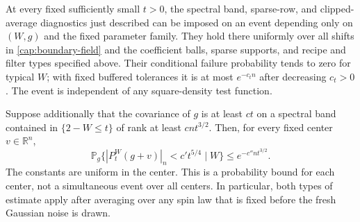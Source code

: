 \begin{lemma}\label{cap:boundary-noise}
At every fixed sufficiently small $t>0$, the spectral band, sparse-row,
and clipped-average diagnostics just described can be imposed on an
event depending only on $(W,g)$ and the fixed parameter family.
They hold there uniformly over all shifts in \eqref{cap:boundary-field}
and the coefficient balls, sparse supports, and recipe and filter types
specified above. Their conditional failure
probability tends to zero for typical $W$; with fixed buffered tolerances
it is at most $e^{-c_tn}$ after decreasing $c_t>0$.  The event is independent
of any square-density test function.

Suppose additionally that the covariance of $g$ is at least $ct$ on a
spectral band contained in $\{2-W\le t\}$ of rank at least $cnt^{3/2}$.
Then, for every fixed center $v\in\mathbb R^n$,
\begin{equation}\label{cap:small-ball}
 \mathbb P_g\bigl\{|P_t^W(g+v)|_n<c't^{5/4}\mid W\bigr\}
 \le e^{-c''nt^{3/2}}.
\end{equation}
The constants are uniform in the center.  This is a probability bound
for each center, not a simultaneous event over all centers.
In particular, both types of estimate apply after averaging over any
spin law that is fixed before the fresh Gaussian noise is drawn.
\end{lemma}

